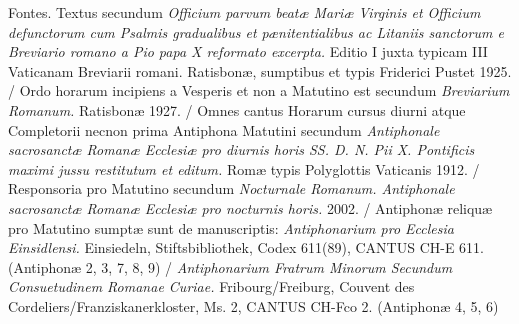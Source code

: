 \documentclass[a4paper, twoside, 12pt]{article}
\begin{document}



\pagebreak



\pagebreak



\pagebreak



\pagebreak






\fancyhead[LE]{\thepage\ / }
\fancyhead[RO]{ / \thepage}



\pagebreak





\pagebreak



\pagestyle{empty}

\tableofcontents

\vfill

\pagebreak

Fontes. 
Textus secundum 
\textit{Officium parvum beatæ Mariæ Virginis et Officium
defunctorum cum Psalmis gradualibus et pænitentialibus ac Litaniis sanctorum
e Breviario romano a Pio papa X reformato excerpta.}
Editio I juxta typicam III Vaticanam Breviarii romani. 
Ratisbonæ, sumptibus et typis Friderici Pustet 1925. /
Ordo horarum incipiens a Vesperis et non a Matutino est secundum
\textit{Breviarium Romanum.} Ratisbonæ 1927. /
Omnes cantus Horarum cursus diurni atque Completorii 
necnon prima Antiphona Matutini secundum
\textit{Antiphonale sacrosanctæ Romanæ Ecclesiæ pro diurnis horis
SS. D. N. Pii X. Pontificis maximi jussu restitutum et editum.}
Romæ typis Polyglottis Vaticanis 1912. /
Responsoria pro Matutino secundum 
\textit{Nocturnale Romanum. Antiphonale sacrosanctæ Romanæ Ecclesiæ
pro nocturnis horis.}
2002. /
Antiphonæ reliquæ pro Matutino sumptæ sunt de manuscriptis:
\textit{Antiphonarium pro Ecclesia Einsidlensi.}
Einsiedeln, Stiftsbibliothek, Codex 611(89), CANTUS CH-E 611.
(Antiphonæ 2, 3, 7, 8, 9) /
\textit{Antiphonarium Fratrum Minorum Secundum Consuetudinem Romanae Curiae.}
Fribourg/Freiburg, Couvent des Cordeliers/Franziskanerkloster, Ms. 2,
CANTUS CH-Fco 2.
(Antiphonæ 4, 5, 6)
\end{document}
